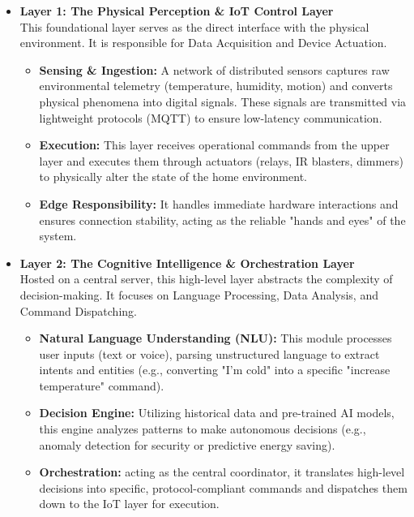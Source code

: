 \begin{itemize}
    \item \textbf{Layer 1: The Physical Perception \& IoT Control Layer} \\
    This foundational layer serves as the direct interface with the physical environment. It is responsible for Data Acquisition and Device Actuation.
    \begin{itemize}
        \item \textbf{Sensing \& Ingestion:} A network of distributed sensors captures raw environmental telemetry (temperature, humidity, motion) and converts physical phenomena into digital signals. These signals are transmitted via lightweight protocols (MQTT) to ensure low-latency communication.
        \item \textbf{Execution:} This layer receives operational commands from the upper layer and executes them through actuators (relays, IR blasters, dimmers) to physically alter the state of the home environment.
        \item \textbf{Edge Responsibility:} It handles immediate hardware interactions and ensures connection stability, acting as the reliable "hands and eyes" of the system.
    \end{itemize}

    \item \textbf{Layer 2: The Cognitive Intelligence \& Orchestration Layer} \\
    Hosted on a central server, this high-level layer abstracts the complexity of decision-making. It focuses on Language Processing, Data Analysis, and Command Dispatching.
    \begin{itemize}
        \item \textbf{Natural Language Understanding (NLU):} This module processes user inputs (text or voice), parsing unstructured language to extract intents and entities (e.g., converting "I'm cold" into a specific "increase temperature" command).
        \item \textbf{Decision Engine:} Utilizing historical data and pre-trained AI models, this engine analyzes patterns to make autonomous decisions (e.g., anomaly detection for security or predictive energy saving).
        \item \textbf{Orchestration:} acting as the central coordinator, it translates high-level decisions into specific, protocol-compliant commands and dispatches them down to the IoT layer for execution.
    \end{itemize}
\end{itemize}

